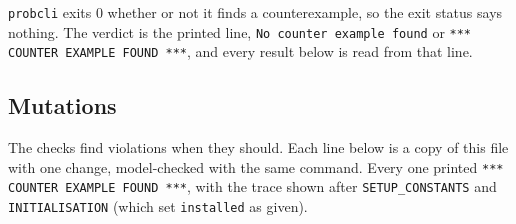 \documentclass[a4paper,10pt,fleqn]{article}
\begin{document}
\texttt{probcli} exits 0 whether or not it finds a counterexample, so the
exit status says nothing. The verdict is the printed line,
\texttt{No counter example found} or \texttt{*** COUNTER EXAMPLE FOUND ***},
and every result below is read from that line.

\subsection{Mutations}

The checks find violations when they should. Each line below is a copy of
this file with one change, model-checked with the same command. Every one
printed \texttt{*** COUNTER EXAMPLE FOUND ***}, with the trace shown after
\texttt{SETUP\_CONSTANTS} and \texttt{INITIALISATION} (which set
\texttt{installed} as given).
\end{document}

